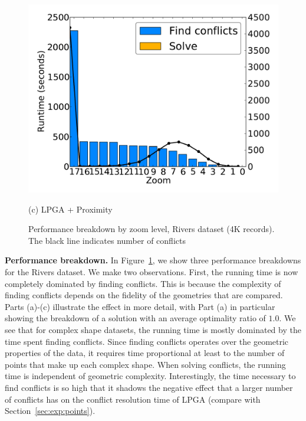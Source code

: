 \documentclass[11pt, oneside]{report}
\newcommand{\minisec}[1]{\noindent\textbf{#1.}}
\begin{document}
{\begin{figure}[tb]
\begin{minipage}{0.329\linewidth}
    \centerline{\includegraphics[width=1\linewidth]{./figs-cvl/prelim_lin_30k_uswaterway_lp_B.pdf}}
    \centerline{(c) LPGA + Proximity}
  \end{minipage}
  \caption{Performance breakdown by zoom level, Rivers dataset (4K records). The black line indicates number of conflicts} \label{fig:performance:complex}
\end{figure}


\minisec{Performance breakdown}
In Figure~\ref{fig:performance:complex}, we show three performance breakdowns for the Rivers dataset. We make two observations. First, the running time is now completely dominated by finding conflicts. This is because the complexity of finding conflicts depends on the fidelity of the geometries that are compared. 
Parts (a)-(c) illustrate the effect in more detail, with Part (a) in particular showing the breakdown of a solution with an average optimality ratio of $1.0$. We see that for complex shape datasets, the running time is mostly dominated by the time spent finding conflicts. Since finding conflicts operates over the geometric properties of the data, it requires time proportional at least to the number of points that make up each complex shape. When solving conflicts, the running time is independent of geometric complexity. Interestingly, the time necessary to find conflicts is so high that it shadows the negative effect that a larger number of conflicts has on the conflict resolution time of LPGA (compare with Section~\ref{sec:exp:points}).

}
\end{document}
